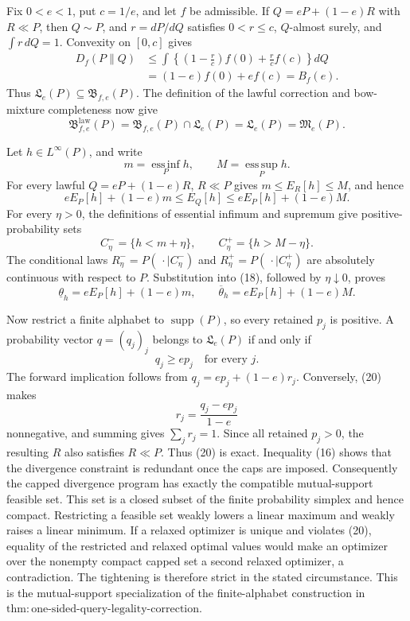 Fix \(0<e<1\), put \(c=1/e\), and let \(f\) be admissible.  If \(Q=eP+(1-e)R\) with \(R\ll P\), then \(Q\sim P\), and \(r=dP/dQ\) satisfies \(0<r\le c\), \(Q\)-almost surely, and \(\int r\,dQ=1\).  Convexity on \([0,c]\) gives
\[
 \begin{aligned}
 D_f(P\|Q)
 &\le\int\left\{\left(1-\frac rc\right)f(0)+\frac rc f(c)\right\}dQ\\
 &=(1-e)f(0)+ef(c)=B_f(e).
 \end{aligned} \tag{16}
\]
Thus \(\mathfrak L_e(P)\subseteq\mathfrak B_{f,e}(P)\).  The definition of the lawful correction and bow-mixture completeness now give
\[
 \mathfrak B^{\mathrm{law}}_{f,e}(P)
 =\mathfrak B_{f,e}(P)\cap\mathfrak L_e(P)
 =\mathfrak L_e(P)=\mathfrak M_e(P). \tag{17}
\]

Let \(h\in L^\infty(P)\), and write
\[
 m=\operatorname*{ess\,inf}_P h,\qquad
 M=\operatorname*{ess\,sup}_P h.
\]
For every lawful \(Q=eP+(1-e)R\), \(R\ll P\) gives \(m\le E_R[h]\le M\), and hence
\[
 eE_P[h]+(1-e)m\le E_Q[h]\le eE_P[h]+(1-e)M. \tag{18}
\]
For every \(\eta>0\), the definitions of essential infimum and supremum give positive-probability sets
\[
 C^-_\eta=\{h<m+\eta\},
 \qquad
 C^+_\eta=\{h>M-\eta\}.
\]
The conditional laws \(R^-_\eta=P(\,\cdot\mid C^-_\eta)\) and \(R^+_\eta=P(\,\cdot\mid C^+_\eta)\) are absolutely continuous with respect to \(P\).  Substitution into (18), followed by \(\eta\downarrow0\), proves
\[
 \underline\theta_h=eE_P[h]+(1-e)m,
 \qquad
 \overline\theta_h=eE_P[h]+(1-e)M. \tag{19}
\]

Now restrict a finite alphabet to \(\operatorname{supp}(P)\), so every retained \(p_j\) is positive.  A probability vector \(q=(q_j)_j\) belongs to \(\mathfrak L_e(P)\) if and only if
\[
 q_j\ge ep_j\quad\text{for every }j. \tag{20}
\]
The forward implication follows from \(q_j=ep_j+(1-e)r_j\).  Conversely, (20) makes
\[
 r_j=\frac{q_j-ep_j}{1-e}
\]
nonnegative, and summing gives \(\sum_jr_j=1\).  Since all retained \(p_j>0\), the resulting \(R\) also satisfies \(R\ll P\).  Thus (20) is exact.  Inequality (16) shows that the divergence constraint is redundant once the caps are imposed.  Consequently the capped divergence program has exactly the compatible mutual-support feasible set.  This set is a closed subset of the finite probability simplex and hence compact.  Restricting a feasible set weakly lowers a linear maximum and weakly raises a linear minimum.  If a relaxed optimizer is unique and violates (20), equality of the restricted and relaxed optimal values would make an optimizer over the nonempty compact capped set a second relaxed optimizer, a contradiction.  The tightening is therefore strict in the stated circumstance.  This is the mutual-support specialization of the finite-alphabet construction in \(\mathrm{thm:one\text{-}sided\text{-}query\text{-}legality\text{-}correction}\).

